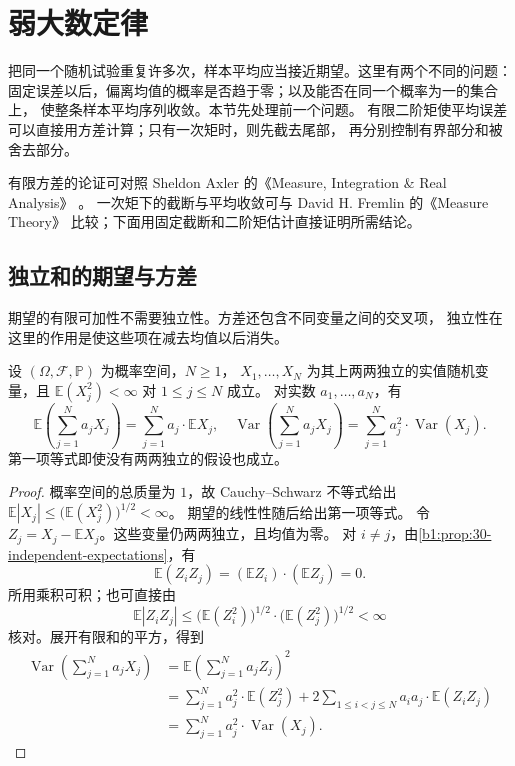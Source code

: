 \section{弱大数定律}
\label{b1:sec:3004}

把同一个随机试验重复许多次，样本平均应当接近期望。这里有两个不同的问题：
固定误差以后，偏离均值的概率是否趋于零；以及能否在同一个概率为一的集合上，
使整条样本平均序列收敛。本节先处理前一个问题。
有限二阶矩使平均误差可以直接用方差计算；只有一次矩时，则先截去尾部，
再分别控制有界部分和被舍去部分。

\ProseParagraphBreak

有限方差的论证可对照 Sheldon Axler 的《Measure, Integration \& Real Analysis》%
\cite[12.37--12.38, pp.~396--397]{Axler2020Measure}。
一次矩下的截断与平均收敛可与 David H. Fremlin 的《Measure Theory》%
\cite[273N(a)]{Fremlin2016Measure}比较；下面用固定截断和二阶矩估计直接证明所需结论。

\subsection{独立和的期望与方差}
\label{b1:subsec:300401}

期望的有限可加性不需要独立性。方差还包含不同变量之间的交叉项，
独立性在这里的作用是使这些项在减去均值以后消失。

\begin{proposition}[期望与方差的有限加法]
\label{b1:prop:30-variance-sum}
设 \((\Omega,\mathcal F,\mathbb P)\) 为概率空间，\(N\geq1\)，
\(X_1,\ldots,X_N\) 为其上两两独立的实值随机变量，且
\(\mathbb E(X_j^2)<\infty\) 对 \(1\leq j\leq N\) 成立。
对实数 \(a_1,\ldots,a_N\)，有
\[
 \mathbb E\left(\sum_{j=1}^N a_jX_j\right)
 =\sum_{j=1}^N a_j\cdot\mathbb E X_j,
 \quad
 \operatorname{Var}\left(\sum_{j=1}^N a_jX_j\right)
 =\sum_{j=1}^N a_j^2\cdot\operatorname{Var}(X_j).
\]
第一项等式即使没有两两独立的假设也成立。
\end{proposition}
\begin{proof}
概率空间的总质量为 \(1\)，故 Cauchy--Schwarz 不等式给出
\(\mathbb E|X_j|\leq\bigl(\mathbb E(X_j^2)\bigr)^{1/2}<\infty\)。
期望的线性性随后给出第一项等式。
令 \(Z_j=X_j-\mathbb E X_j\)。这些变量仍两两独立，且均值为零。
对 \(i\ne j\)，由\cref{b1:prop:30-independent-expectations}，有
\[
 \mathbb E(Z_iZ_j)=(\mathbb E Z_i)\cdot(\mathbb E Z_j)=0.
\]
所用乘积可积；也可直接由
\[
 \mathbb E|Z_iZ_j|
 \leq\bigl(\mathbb E(Z_i^2)\bigr)^{1/2}
       \cdot\bigl(\mathbb E(Z_j^2)\bigr)^{1/2}<\infty
\]
核对。展开有限和的平方，得到
\[
 \begin{aligned}
 \operatorname{Var}\left(\sum_{j=1}^N a_jX_j\right)
 &=\mathbb E\left(\sum_{j=1}^N a_jZ_j\right)^2\\
 &=\sum_{j=1}^N a_j^2\cdot\mathbb E(Z_j^2)
   +2\sum_{1\leq i<j\leq N}a_ia_j\cdot\mathbb E(Z_iZ_j)\\
 &=\sum_{j=1}^N a_j^2\cdot\operatorname{Var}(X_j).
 \end{aligned}
\]
\end{proof}


